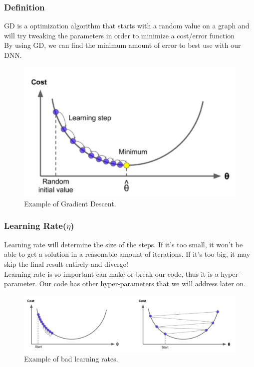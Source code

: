 \documentclass[article]{llncs}
\begin{document}
\subsubsection{Definition}
GD is a optimization algorithm that starts with a random value on a graph and will try tweaking the parameters in order to minimize a cost/error function\\
By using GD, we can find the minimum amount of error to best use with our DNN.\\
\begin{figure}[H]
\centering
\includegraphics[scale=0.60]{fig4.PNG}
\caption{Example of Gradient Descent.} \label{fig4}
\end{figure}
\subsubsection{Learning Rate($\eta$)}
Learning rate will determine the size of the steps. If it's too small, it won't be able to get a solution in a reasonable amount of iterations. If it's too big, it may skip the final result entirely and diverge!\\
Learning rate is so important can make or break our code, thus it is a hyper-parameter. Our code has other hyper-parameters that we will address later on.
\begin{figure}[H]
\centering
\includegraphics[scale=0.50]{fig5.PNG}
\caption{Example of bad learning rates.} \label{fig5}
\end{figure}
\end{document}
